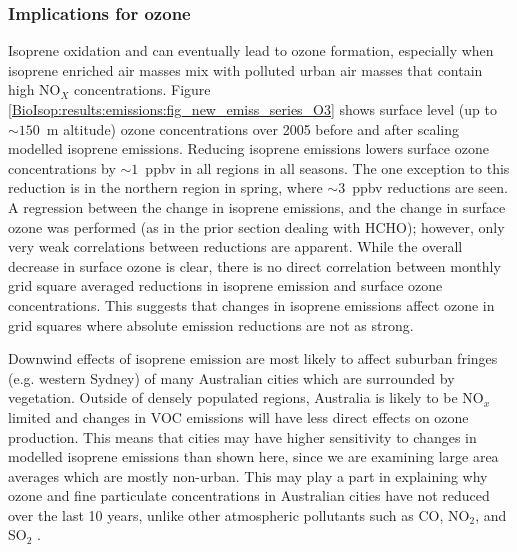     \subsubsection{Implications for ozone}
  
      Isoprene oxidation and can eventually lead to ozone formation, especially when isoprene enriched air masses mix with polluted urban air masses that contain high NO$_X$ concentrations.
      Figure \ref{BioIsop:results:emissions:fig_new_emiss_series_O3} shows surface level (up to $\sim 150$~m altitude) ozone concentrations over 2005 before and after scaling modelled isoprene emissions.
      Reducing isoprene emissions lowers surface ozone concentrations by $\sim1$~ppbv in all regions in all seasons.
      The one exception to this reduction is in the northern region in spring, where $\sim3$~ppbv reductions are seen.
      A regression between the change in isoprene emissions, and the change in surface ozone was performed (as in the prior section dealing with HCHO); however, only very weak correlations between reductions are apparent.
      While the overall decrease in surface ozone is clear, there is no direct correlation between monthly grid square averaged reductions in isoprene emission and surface ozone concentrations.
      This suggests that changes in isoprene emissions affect ozone in grid squares where absolute emission reductions are not as strong.
      
      
      
      Downwind effects of isoprene emission are most likely to affect suburban fringes (e.g. western Sydney) of many Australian cities which are surrounded by vegetation.
      Outside of densely populated regions, Australia is likely to be NO$_x$ limited and changes in VOC emissions will have less direct effects on ozone production.
      This means that cities may have higher sensitivity to changes in modelled isoprene emissions than shown here, since we are examining large area averages which are mostly non-urban.
      This may play a part in explaining why ozone and fine particulate concentrations in Australian cities have not reduced over the last 10 years, unlike other atmospheric pollutants such as CO, NO$_2$, and SO$_2$ \parencite{SOE2016}.
      
